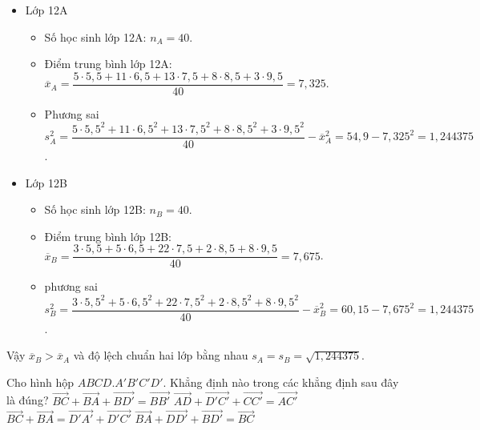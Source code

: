 \begin{ex}
{\begin{itemize}
			\item Lớp 12A
			\begin{itemize}
				\item Số học sinh lớp 12A: $n_A = 40$.
				\item Điểm trung bình lớp 12A: $\overline{x}_A = \dfrac{5 \cdot 5{,}5 + 11 \cdot 6{,}5 + 13 \cdot 7{,}5 + 8 \cdot 8{,}5 + 3 \cdot 9{,}5}{40} = 7{,}325$.
				\item Phương sai $s_A^2 =\dfrac{5 \cdot 5{,}5^2 + 11 \cdot 6{,}5^2 + 13 \cdot 7{,}5^2 + 8 \cdot 8{,}5^2 + 3 \cdot 9{,}5^2}{40}-  \overline{x}_A^2 = 54{,}9 - 7{,}325^2 = 1{,}244375$.
			\end{itemize}
			\item Lớp 12B
			\begin{itemize}
				\item Số học sinh lớp 12B: $n_B = 40$.
				\item Điểm trung bình lớp 12B: $\overline{x}_B = \dfrac{3 \cdot 5{,}5 + 5 \cdot 6{,}5 + 22 \cdot 7{,}5 + 2 \cdot 8{,}5 + 8 \cdot 9{,}5}{40} = 7,675$.
				\item phương sai $s_B^2 = \dfrac{3 \cdot 5{,}5^2 + 5 \cdot 6{,}5^2 + 22 \cdot 7{,}5^2 + 2 \cdot 8{,}5^2 + 8 \cdot 9{,}5^2}{40}-\overline{x}_B^2 = 60{,}15 - 7{,}675^2 = 1{,}244375$.
			\end{itemize}
		\end{itemize}
		Vậy $\overline{x}_B > \overline{x}_A$ và độ lệch chuẩn hai lớp bằng nhau $s_A = s_B = \sqrt{1,244375}$.
	}
\end{ex}
\begin{ex}%
	Cho hình hộp $ABCD.A'B'C'D'$. Khẳng định nào trong các khẳng định sau đây là đúng?
	\choice
	{$\overrightarrow{BC} + \overrightarrow{BA} + \overrightarrow{BD'} = \overrightarrow{BB'}$}
	{\True $\overrightarrow{AD} + \overrightarrow{D'C'} + \overrightarrow{CC'} = \overrightarrow{AC'}$}
	{$\overrightarrow{BC} + \overrightarrow{BA} = \overrightarrow{D'A'} + \overrightarrow{D'C'}$}
	{$\overrightarrow{BA} + \overrightarrow{DD'} + \overrightarrow{BD'} = \overrightarrow{BC}$}
\end{ex}
